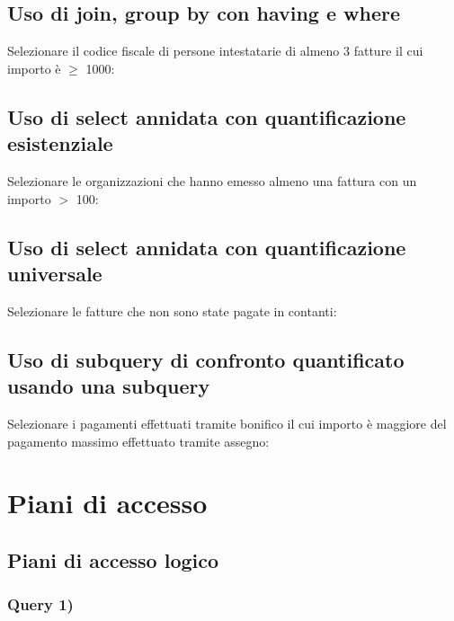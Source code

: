 \documentclass[a4paper,12pt]{article}
\begin{document}
%


 \subsection{ Uso di join, group by con having e where }

Selezionare il codice fiscale di persone intestatarie di almeno 3 fatture il cui importo è $\geq$ 1000:



 \subsection{ Uso di select annidata con quantificazione esistenziale }

Selezionare le organizzazioni che hanno emesso almeno una fattura con un importo $>$ 100:



 \subsection{ Uso di select annidata con quantificazione universale }

Selezionare le fatture che non sono state pagate in contanti:

%

 \subsection{ Uso di subquery di confronto quantificato usando una subquery }

Selezionare i pagamenti effettuati tramite bonifico il cui importo è maggiore del pagamento massimo effettuato tramite assegno:

%

 \section{ Piani di accesso }

 \subsection{ Piani di accesso logico }

 \subsubsection{ Query 1) }
\end{document}
